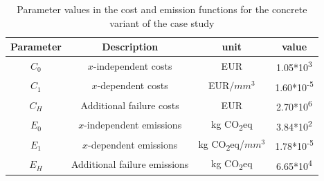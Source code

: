 \begin{table}[h]
    \centering
    \begin{tabular}{c|c|c|c}
         Parameter & Description& unit  &value 
\\ \hline
 $C_0$& $x$-independent costs& EUR  &1.05*10\textsuperscript{3}\\
 $C_1$& $x$-dependent costs&EUR$/mm^3$ &1.60*10\textsuperscript{-5}\\
 $C_H$& Additional failure costs&EUR &2.70*10\textsuperscript{6}
\\
 $E_0$& $x$-independent emissions&kg CO\textsubscript{2}eq &3.84*10\textsuperscript{2}\\
 $E_1$& $x$-dependent emissions&kg CO\textsubscript{2}eq/$mm^3$ &1.78*10\textsuperscript{-5}\\
 $E_H$& Additional failure emissions&kg CO\textsubscript{2}eq &6.65*10\textsuperscript{4}\\\end{tabular}
    \caption{Parameter values in the cost and emission functions for the concrete variant of the case study}
    \label{tab:C_E_params_concrete}
\end{table}

